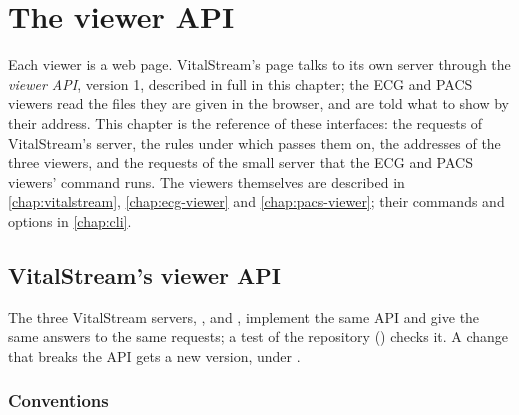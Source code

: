 \chapter{The viewer API}
\label{chap:viewer-api}

Each viewer is a web page. VitalStream's page talks to its own server through the
\emph{viewer API}, version 1, described in full in this chapter; the ECG and PACS viewers read
the files they are given in the browser, and are told what to show by their address. This
chapter is the reference of these interfaces: the requests of VitalStream's server, the rules
under which \md{} passes them on, the addresses of the three viewers, and the requests of the
small server that the ECG and PACS viewers' command  runs. The viewers themselves
are described in \cref{chap:vitalstream}, \cref{chap:ecg-viewer} and \cref{chap:pacs-viewer};
their commands and options in \cref{chap:cli}.

\section{VitalStream's viewer API}
\label{sec:viewer-api-vitalstream}

The three VitalStream servers, ,  and
, implement the same API and give the same answers to the same requests;
a test of the repository () checks it.
A change that breaks the API gets a new version, under .

\subsection{Conventions}
\label{sec:viewer-api-conventions}


